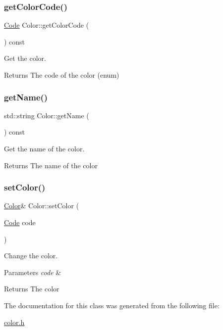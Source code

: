 \subsubsection{\texorpdfstring{get\+Color\+Code()}{getColorCode()}}
{\footnotesize\ttfamily \hyperlink{classColor_a20a7b04657c1d83fae5d54514d3f1622}{Code} Color\+::get\+Color\+Code (\begin{DoxyParamCaption}{ }\end{DoxyParamCaption}) const}



Get the color. 

\begin{DoxyReturn}{Returns}
The code of the color (enum) 
\end{DoxyReturn}
\mbox{\label{classColor_ad12970fef3d1a60a450a9e3cee1057fb}} 
\subsubsection{\texorpdfstring{get\+Name()}{getName()}}
{\footnotesize\ttfamily std\+::string Color\+::get\+Name (\begin{DoxyParamCaption}{ }\end{DoxyParamCaption}) const}



Get the name of the color. 

\begin{DoxyReturn}{Returns}
The name of the color 
\end{DoxyReturn}
\mbox{\label{classColor_ac8b95bf17259268c7b8bd529474be47e}} 
\subsubsection{\texorpdfstring{set\+Color()}{setColor()}}
{\footnotesize\ttfamily \hyperlink{classColor}{Color}\& Color\+::set\+Color (\begin{DoxyParamCaption}\item[{\hyperlink{classColor_a20a7b04657c1d83fae5d54514d3f1622}{Code}}]{code }\end{DoxyParamCaption})}



Change the color. 


\begin{DoxyParams}{Parameters}
{\em code} & \\
\hline
\end{DoxyParams}
\begin{DoxyReturn}{Returns}
The color 
\end{DoxyReturn}


The documentation for this class was generated from the following file\+:\begin{DoxyCompactItemize}
\item 
\hyperlink{color_8h}{color.\+h}\end{DoxyCompactItemize}
